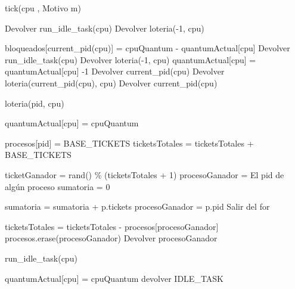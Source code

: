 \begin{algorithm}[H]
\caption{tick(cpu , Motivo m)}
\label{pseudo:tick}
\begin{algorithmic}

		\STATE Devolver run\_idle\_task(cpu)
	\ELSE
		\STATE Devolver loteria(-1, cpu)	
	\ENDIF
	
	\STATE bloqueados[current\_pid(cpu)] = cpuQuantum - quantumActual[cpu]
		\STATE Devolver run\_idle\_task(cpu)
	\ELSE
		\STATE Devolver loteria(-1, cpu)	
	\ENDIF
\ELSE
	\STATE quantumActual[cpu] = quantumActual[cpu] -1	
			\STATE Devolver current\_pid(cpu)
		\ELSE
			\STATE Devolver loteria(current\_pid(cpu), cpu)
		\ENDIF
	\ELSE
		\STATE Devolver current\_pid(cpu)
	\ENDIF
\ENDIF
\ENDIF
\end{algorithmic}
\end{algorithm}




\begin{algorithm}[H]
\caption{loteria(pid, cpu)}
\label{pseudo:loteria}
\begin{algorithmic}

\STATE quantumActual[cpu] = cpuQuantum

	\STATE procesos[pid] = BASE\_TICKETS
	\STATE ticketsTotales = ticketsTotales + BASE\_TICKETS
\ENDIF

\STATE ticketGanador = rand() \% (ticketsTotales + 1)
\STATE procesoGanador = El pid de algún proceso
\STATE sumatoria = 0

\STATE sumatoria = sumatoria + p.tickets
	\STATE procesoGanador = p.pid
	\STATE Salir del for
\ENDIF

\ENDFOR

\STATE ticketsTotales = ticketsTotales - procesos[procesoGanador]
\STATE procesos.erase(procesoGanador)
\STATE Devolver procesoGanador
\end{algorithmic}
\end{algorithm}

\begin{algorithm}[H]
\caption{run\_idle\_task(cpu)}
\label{pseudo:runidletask}
\begin{algorithmic}
	\STATE quantumActual[cpu] = cpuQuantum
	\STATE devolver IDLE\_TASK
\end{algorithmic}
\end{algorithm}

